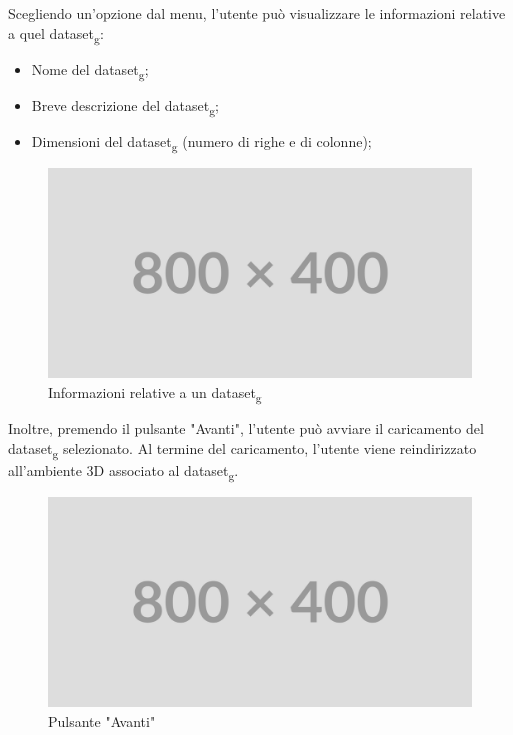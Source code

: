 Scegliendo un'opzione dal menu, l'utente può visualizzare le informazioni
relative a quel dataset\textsubscript{g}:
\begin{itemize}
    \item Nome del dataset\textsubscript{g};
    \item Breve descrizione del dataset\textsubscript{g};
    \item Dimensioni del dataset\textsubscript{g} (numero di righe e di colonne);
\end{itemize}
\begin{figure}[ht!]
    \centering
    \includegraphics[scale=0.6]{template/images/placeholder.png}
    \caption{Informazioni relative a un dataset\textsubscript{g}}
\end{figure}
Inoltre, premendo il pulsante "Avanti", l'utente può avviare il caricamento del
dataset\textsubscript{g} selezionato. Al termine del caricamento, l'utente viene reindirizzato
all'ambiente 3D associato al dataset\textsubscript{g}.
\begin{figure}[ht!]
    \centering
    \includegraphics[scale=0.6]{template/images/placeholder.png}
    \caption{Pulsante "Avanti"}
\end{figure}


